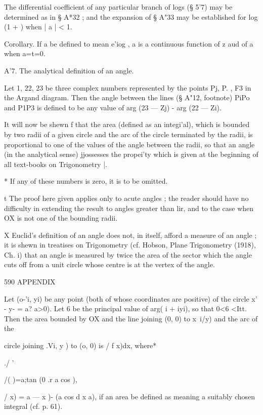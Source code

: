 The differential coefficient of any particular branch of logs (§ 5'7) may be determined 
as in § A*32 ; and the expansion of § A"33 may be established for log (1 + ) when | a | < 1. 

Corollary. If a  be defined to mean e'iog , a  is a continuous function of z aud of a 
when a=t=0. 

A'7. The analytical definition of an angle. 

Let  1, 22, 23 be three complex numbers represented by the points Pj, P. , F3 in the 
Argand diagram. Then the angle between the lines (§ A"12, footnote) PiPo and P1P3 is 
defined to be any value of arg (23 — Zj) - arg (22 — Zi). 

It will now be shewn f that the area (defined as an integi'al), which is bounded by two 
radii of a given circle and the arc of the circle terminated by the radii, is proportional to 
one of the values of the angle between the radii, so that an angle (in the analytical sense) 
jjossesses the propei'ty which is given at the beginning of all text-books on Trigonometry |. 

* If any of these numbers is zero, it is to be omitted. 

t The proof here given applies only to acute angles ; the reader should have no difficulty in 
extending the result to angles greater than lir, and to the case when OX is not one of the 
bounding radii. 

X Euclid's definition of an angle does not, in itself, afford a measure of an angle ; it is shewn 
in treatises on Trigonometry (cf. Hobson, Plane Trigonometry (1918), Ch. i) that an angle is 
measured by twice the area of the sector which the angle cuts off from a unit circle whose centre 
is at the vertex of the angle. 



590 APPENDIX 

Let (o-'i, yi) be any point (both of whose coordinates are positive) of the circle 
x' - y- = a? a>0). Let 6 be the principal value of arg( i + iyi), so that 0<6 <Itt. 
Then the area bounded by OX and the line joining (0, 0) to  x\, i/y) and the arc of the 

circle joining  .Vi, y ) to (o, 0) is / f x)dx, where* 

./ ' 

/( )=a;tan  (0   .r   a cos  ), 

/  x) =  a  — x )- (a cos d  x a), 
if an area be defined as meaning a suitably chosen integral (cf. p. 61). 

